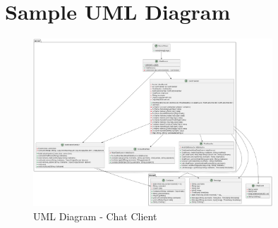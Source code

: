 \documentclass[a4paper,11pt]{article}
\begin{document}
\newpage
\section{Sample UML Diagram}
\begin{figure}[h]
    \centering
    \includegraphics[width=0.8\textwidth]{server.png} %
    \caption{UML Diagram - Chat Client}
\end{figure}

\newpage
{}
\setcounter{page}{5}
\renewcommand\refname{References}
\printbibliography
\end{document}
